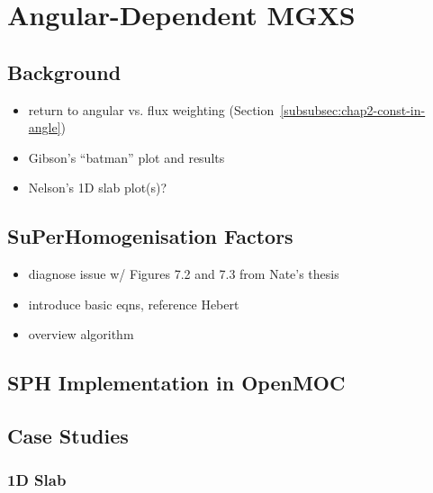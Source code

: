 \chapter{Angular-Dependent MGXS}
\label{chap:sph}


\section{Background}
\label{sec:chap5-background}

\begin{itemize}[noitemsep]
  \item return to angular vs. flux weighting (Section~\ref{subsubsec:chap2-const-in-angle})
  \item Gibson's ``batman'' plot and results
  \item Nelson's 1D slab plot(s)?
\end{itemize}


\section{SuPerHomogenisation Factors}
\label{sec:chap5-sph}

\begin{itemize}
  \item diagnose issue w/ Figures 7.2 and 7.3 from Nate's thesis
  \item introduce basic eqns, reference Hebert
  \item overview algorithm
\end{itemize}


\section{SPH Implementation in OpenMOC}
\label{sec:chap5-sph-openmoc}


\section{Case Studies}
\label{sec:chap5-sph-results}

\subsection{1D Slab}
\label{subsubsec:chap5-sph-slab}

